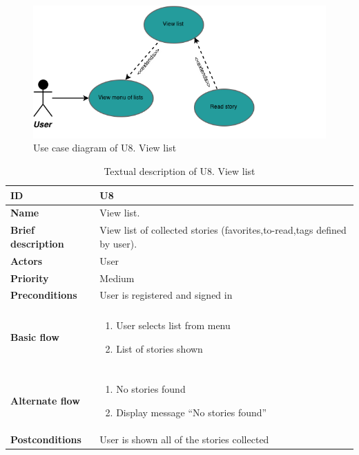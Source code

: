 \begin{figure}[hp]
	\includegraphics[width=\textwidth]{fig/U8}
	\centering
	\caption{Use case diagram of U8. View list}
	\label{Fig:U8}
\end{figure}

\begin{table}[hp]
	\renewcommand{\arraystretch}{1.5}
	\centering
	\caption{Textual description of U8. View list}
	\begin{tabular}[b]{|l | l|}\hline
		\textbf{ID} 				& U8									\\\hline
		\textbf{Name} 				& View list.							\\\hline
		\textbf{Brief description}	& View list of collected stories (favorites,to-read,tags defined by user). 			\\\hline
		\textbf{Actors} 			& User									\\\hline
		\textbf{Priority}			& Medium								\\\hline
		\textbf{Preconditions}		& User is registered and signed in		\\\hline&\\[-2ex]
		\textbf{Basic flow}			& \begin{minipage}{5in}
			\begin{enumerate}[noitemsep]
				\item User selects list from menu
				\item List of stories shown
			\end{enumerate}						
		\end{minipage}						\\\hline&\\[-2ex]
		\textbf{Alternate flow}		& \begin{minipage}{5in}
			\begin{enumerate}[noitemsep]
				\item No stories found
				\item Display message “No stories found”
			\end{enumerate}
		\end{minipage}							\\\hline
		\textbf{Postconditions}		& User is shown all of the stories collected\\\hline
	\end{tabular}
	\label{Tab:U8}
\end{table}

